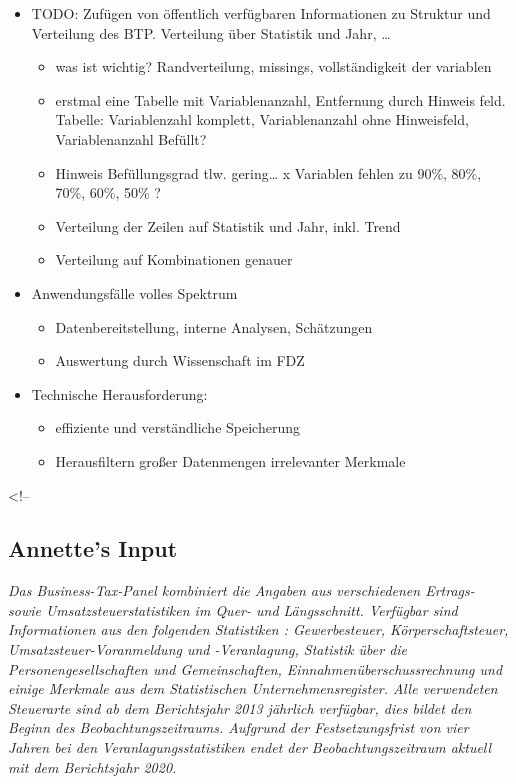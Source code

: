 \documentclass[
  german,
  10pt,
  twoside]{article}
\providecommand{\tightlist}{%
  \setlength{\itemsep}{0pt}\setlength{\parskip}{0pt}}
\begin{document}
\begin{itemize}
\tightlist
\item
  TODO: Zufügen von öffentlich verfügbaren Informationen zu Struktur und
  Verteilung des BTP. Verteilung über Statistik und Jahr, \ldots{}

  \begin{itemize}
  \tightlist
  \item
    was ist wichtig? Randverteilung, missings, vollständigkeit der
    variablen
  \item
    erstmal eine Tabelle mit Variablenanzahl, Entfernung durch Hinweis
    feld. Tabelle: Variablenzahl komplett, Variablenanzahl ohne
    Hinweisfeld, Variablenanzahl Befüllt?
  \item
    Hinweis Befüllungsgrad tlw. gering\ldots{} x Variablen fehlen zu
    90\%, 80\%, 70\%, 60\%, 50\% ?
  \item
    Verteilung der Zeilen auf Statistik und Jahr, inkl. Trend
  \item
    Verteilung auf Kombinationen genauer
  \end{itemize}
\item
  Anwendungsfälle volles Spektrum

  \begin{itemize}
  \tightlist
  \item
    Datenbereitstellung, interne Analysen, Schätzungen
  \item
    Auswertung durch Wissenschaft im FDZ
  \end{itemize}
\item
  Technische Herausforderung:

  \begin{itemize}
  \tightlist
  \item
    effiziente und verständliche Speicherung
  \item
    Herausfiltern großer Datenmengen irrelevanter Merkmale
  \end{itemize}
\end{itemize}

\textless!--

\subsection{Annette's Input}\label{annettes-input}

\emph{Das Business-Tax-Panel kombiniert die Angaben aus verschiedenen
Ertrags- sowie Umsatzsteuerstatistiken im Quer- und Längsschnitt.
Verfügbar sind Informationen aus den folgenden Statistiken :
Gewerbesteuer, Körperschaftsteuer, Umsatzsteuer-Voranmeldung und
-Veranlagung, Statistik über die Personengesellschaften und
Gemeinschaften, Einnahmenüberschussrechnung und einige Merkmale aus dem
Statistischen Unternehmensregister. Alle verwendeten Steuerarte sind ab
dem Berichtsjahr 2013 jährlich verfügbar, dies bildet den Beginn des
Beobachtungszeitraums. Aufgrund der Festsetzungsfrist von vier Jahren
bei den Veranlagungsstatistiken endet der Beobachtungszeitraum aktuell
mit dem Berichtsjahr 2020.}
\end{document}
